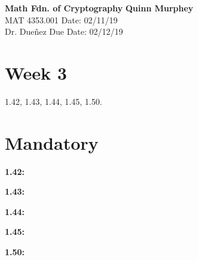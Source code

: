 \documentclass[a4paper, 11pt]{article}
\begin{document}
\noindent
\large\textbf{Math Fdn. of Cryptography} \hfill \textbf{Quinn Murphey} \\
\normalsize MAT 4353.001 \hfill Date: 02/11/19 \\
Dr. Dueñez \hfill Due Date: 02/12/19 \\
\noindent\makebox[\linewidth]{\rule{\paperwidth}{0.4pt}}
\section*{Week 3}
    1.42, 1.43, 1.44, 1.45, 1.50. 
    
\section*{Mandatory}

\noindent\textbf{1.42:}
   
   
   
   
    
\noindent\textbf{1.43:}
   
   
   
   
    
\noindent\textbf{1.44:}
   
   
   
   
   
\noindent\textbf{1.45:}
    
    
    
    
    
\noindent\textbf{1.50:}
    
    
    
    
    
\end{document}
